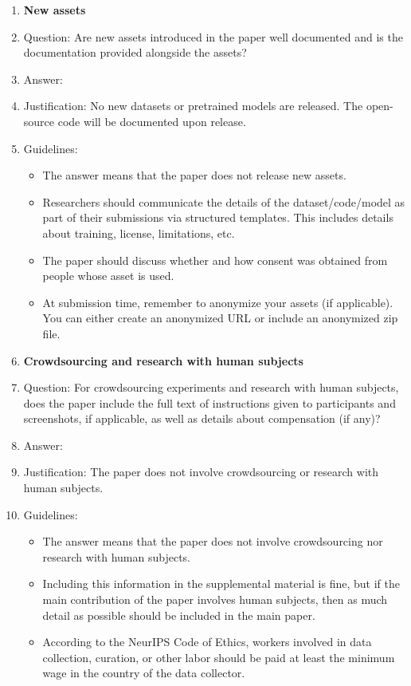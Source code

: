 \documentclass{article}
\begin{document}
\begin{enumerate}
\item {\bf New assets}
    \item[] Question: Are new assets introduced in the paper well documented and is the documentation provided alongside the assets?
    \item[] Answer: \answerNA{}
    \item[] Justification: No new datasets or pretrained models are released. The open-source code will be documented upon release.
    \item[] Guidelines:
    \begin{itemize}
        \item The answer \answerNA{} means that the paper does not release new assets.
        \item Researchers should communicate the details of the dataset/code/model as part of their submissions via structured templates. This includes details about training, license, limitations, etc. 
        \item The paper should discuss whether and how consent was obtained from people whose asset is used.
        \item At submission time, remember to anonymize your assets (if applicable). You can either create an anonymized URL or include an anonymized zip file.
    \end{itemize}

\item {\bf Crowdsourcing and research with human subjects}
    \item[] Question: For crowdsourcing experiments and research with human subjects, does the paper include the full text of instructions given to participants and screenshots, if applicable, as well as details about compensation (if any)? 
    \item[] Answer: \answerNA{}
    \item[] Justification: The paper does not involve crowdsourcing or research with human subjects.
    \item[] Guidelines:
    \begin{itemize}
        \item The answer \answerNA{} means that the paper does not involve crowdsourcing nor research with human subjects.
        \item Including this information in the supplemental material is fine, but if the main contribution of the paper involves human subjects, then as much detail as possible should be included in the main paper. 
        \item According to the NeurIPS Code of Ethics, workers involved in data collection, curation, or other labor should be paid at least the minimum wage in the country of the data collector. 
    \end{itemize}


\end{enumerate}
\end{document}
